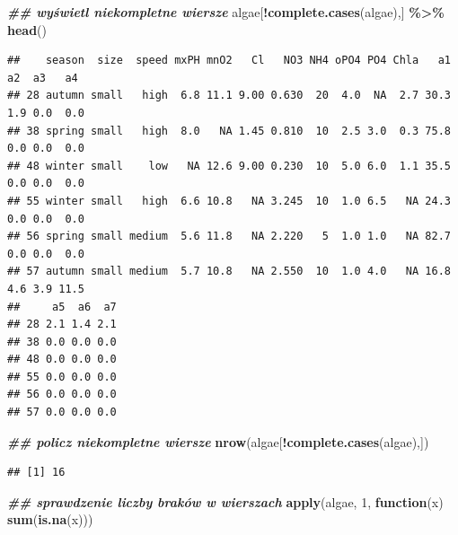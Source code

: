 \documentclass[
]{book}
\newenvironment{Shaded}{\begin{snugshade}}{\end{snugshade}}
\newcommand{\ControlFlowTok}[1]{\textcolor[rgb]{0.13,0.29,0.53}{\textbf{#1}}}
\newcommand{\DecValTok}[1]{\textcolor[rgb]{0.00,0.00,0.81}{#1}}
\newcommand{\DocumentationTok}[1]{\textcolor[rgb]{0.56,0.35,0.01}{\textbf{\textit{#1}}}}
\newcommand{\FunctionTok}[1]{\textcolor[rgb]{0.13,0.29,0.53}{\textbf{#1}}}
\newcommand{\NormalTok}[1]{#1}
\newcommand{\SpecialCharTok}[1]{\textcolor[rgb]{0.81,0.36,0.00}{\textbf{#1}}}
\theoremstyle{plain}
\theoremstyle{definition}
\theoremstyle{definition}
\theoremstyle{definition}
\theoremstyle{definition}
\theoremstyle{definition}
\theoremstyle{remark}
\begin{document}
\begin{Shaded}
\begin{Highlighting}[]
\DocumentationTok{\#\# wyświetl niekompletne wiersze}
\NormalTok{algae[}\SpecialCharTok{!}\FunctionTok{complete.cases}\NormalTok{(algae),] }\SpecialCharTok{\%\textgreater{}\%} \FunctionTok{head}\NormalTok{()}
\end{Highlighting}
\end{Shaded}

\begin{verbatim}
##    season  size  speed mxPH mnO2   Cl   NO3 NH4 oPO4 PO4 Chla   a1  a2  a3   a4
## 28 autumn small   high  6.8 11.1 9.00 0.630  20  4.0  NA  2.7 30.3 1.9 0.0  0.0
## 38 spring small   high  8.0   NA 1.45 0.810  10  2.5 3.0  0.3 75.8 0.0 0.0  0.0
## 48 winter small    low   NA 12.6 9.00 0.230  10  5.0 6.0  1.1 35.5 0.0 0.0  0.0
## 55 winter small   high  6.6 10.8   NA 3.245  10  1.0 6.5   NA 24.3 0.0 0.0  0.0
## 56 spring small medium  5.6 11.8   NA 2.220   5  1.0 1.0   NA 82.7 0.0 0.0  0.0
## 57 autumn small medium  5.7 10.8   NA 2.550  10  1.0 4.0   NA 16.8 4.6 3.9 11.5
##     a5  a6  a7
## 28 2.1 1.4 2.1
## 38 0.0 0.0 0.0
## 48 0.0 0.0 0.0
## 55 0.0 0.0 0.0
## 56 0.0 0.0 0.0
## 57 0.0 0.0 0.0
\end{verbatim}

\begin{Shaded}
\begin{Highlighting}[]
\DocumentationTok{\#\# policz niekompletne wiersze}
\FunctionTok{nrow}\NormalTok{(algae[}\SpecialCharTok{!}\FunctionTok{complete.cases}\NormalTok{(algae),])}
\end{Highlighting}
\end{Shaded}

\begin{verbatim}
## [1] 16
\end{verbatim}

\begin{Shaded}
\begin{Highlighting}[]
\DocumentationTok{\#\# sprawdzenie liczby braków w wierszach}
\FunctionTok{apply}\NormalTok{(algae, }\DecValTok{1}\NormalTok{, }\ControlFlowTok{function}\NormalTok{(x) }\FunctionTok{sum}\NormalTok{(}\FunctionTok{is.na}\NormalTok{(x)))}
\end{Highlighting}
\end{Shaded}
\end{document}
